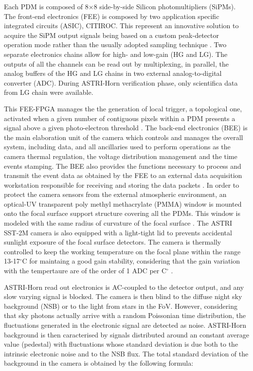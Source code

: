 Each PDM is composed of 8$\times$8 side-by-side Silicon photomultipliers (SiPMs). The front-end electronics (FEE) is composed by two application specific integrated circuits (ASIC), CITIROC. This represent an innovative solution to acquire the SiPM output signals  being based on a custom peak-detector operation mode rather than the usually adopted sampling technique \cite{Sottile2016}. Two separate electronics chains allow for high- and low-gain (HG and LG). The outputs of all the channels can be read out by multiplexing, in parallel, the analog buffers of the HG and LG chains in two external analog-to-digital converter (ADC). During ASTRI-Horn verification phase, only scientifica data from LG chain were available.


This FEE-FPGA manages the the generation of local trigger, a topological one, activated when a given number of contiguous pixels within a PDM presents a signal above a given photo-electron threshold \cite{Sottile2016}.
The back-end electronics (BEE) is the main elaboration unit of the camera which controls and manages the overall system, including data, and all ancillaries used to perform operations as
the camera thermal regulation, the voltage distribution management and the time events stamping.
The BEE also provides the functions necessary to process and transmit the event data as obtained by the FEE to an external data acquisition workstation responsible for receiving and storing the data packets \cite{Sottile2016}.
In order to protect the camera sensors from the external
atmospheric environment, an optical-UV transparent poly methyl methacrylate (PMMA)  window 
is mounted onto the focal surface support structure covering all the PDMs.
This window is modeled with the same radius of curvature of the focal surface \cite{Catalano2018}.
The ASTRI SST-2M camera is also equipped  with a light-tight lid to prevents accidental sunlight 
exposure of the focal surface detectors.
The camera is thermally controlled to keep the working temperature on the focal plane within the range 13-17$^\circ$C
for maintaing a good gain stability, considering that the gain variation with the tempertaure are of the order of 1 ADC per C$^\circ$ \cite{Imnpiombato2012}.


ASTRI-Horn read out electronics is AC-coupled to the detector output, and any slow varying signal is  blocked.
The camera is then blind to the diffuse night sky background (NSB) or to the light from stars in the FoV.   However, considering that sky photons actually arrive with a random Poissonian time distribution, the fluctuations generated in the electronic signal are detected as noise. ASTRI-Horn  background is then caracterised by signals distributed around an constant average value (pedestal) with fluctuations whose standard deviation is due both to the intrinsic electronic noise and to the NSB flux.  The total standard deviation of the background in the camera is obtained by the following formula:

